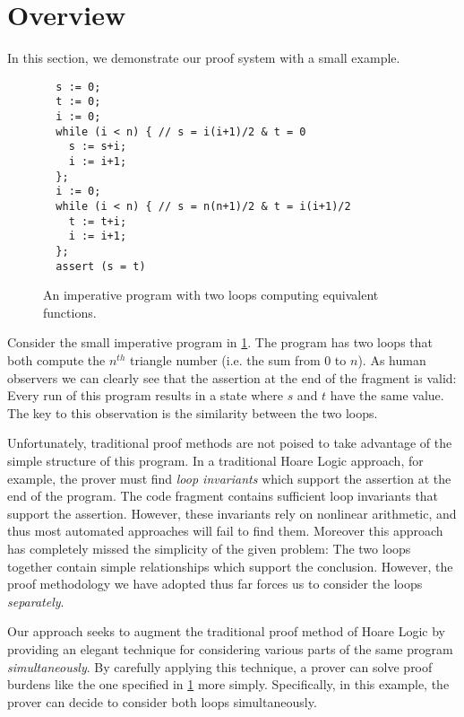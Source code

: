 \documentclass[p.tex]{subfiles}
\begin{document}
\section{Overview}\label{sec:overview}

In this section, we demonstrate our proof system with a small example.

\begin{figure}
\begin{lstlisting}
  s := 0;
  t := 0;
  i := 0;
  while (i < n) { // s = i(i+1)/2 & t = 0
    s := s+i;
    i := i+1;
  };
  i := 0;
  while (i < n) { // s = n(n+1)/2 & t = i(i+1)/2
    t := t+i;
    i := i+1;
  };
  assert (s = t)
\end{lstlisting}
  \caption{%
    An imperative program with two loops computing equivalent
    functions.
  }\label{fig:overview-example}
\end{figure}

Consider the small imperative program in \cref{fig:overview-example}.
The program has two loops that both compute the $n^{th}$ triangle
number (i.e. the sum from 0 to $n$). As human observers we can clearly
see that the assertion at the end of the fragment is valid: Every run
of this program results in a state where $s$ and $t$ have the same
value. The key to this observation is the similarity between the two
loops.

Unfortunately, traditional proof methods are not poised to take
advantage of the simple structure of this program. In a traditional
Hoare Logic approach, for example, the prover must find \emph{loop
invariants} which support the assertion at the end of the program.
The code fragment contains sufficient loop invariants that support the
assertion. However, these invariants rely on nonlinear arithmetic,
and thus most automated approaches will fail to find them.
%
Moreover this approach has completely missed the simplicity of the
given problem: The two loops together contain simple relationships
which support the conclusion. However, the proof methodology we have
adopted thus far forces us to consider the loops \emph{separately}.

Our approach seeks to augment the traditional proof method of Hoare
Logic by providing an elegant technique for considering various parts of the
same program \emph{simultaneously}. By carefully applying this
technique, a prover can solve proof burdens like the one specified in
\cref{fig:overview-example} more simply.
Specifically, in this example, the prover can decide to consider both
loops simultaneously.
\end{document}
